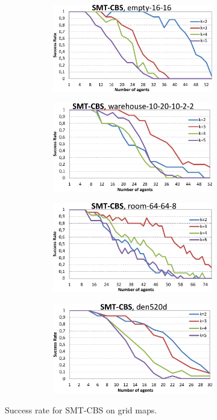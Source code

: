 \documentclass[review]{elsarticle}
\newcommand{\smtcbs}{SMT-CBS\xspace}
\begin{document}
\begin{figure}[t]
\centering
\begin{subfigure}
    \centering
    \begin{subfigure}
        \centering
        \includegraphics[width=0.45\linewidth]{mapfr-sr-plot-smtcbs-empty.pdf}
    \end{subfigure}\hspace{0.025\linewidth}
    \begin{subfigure}
        \centering
        \includegraphics[width=0.45\linewidth]{mapfr-sr-plot-smtcbs-warehouse.pdf}
    \end{subfigure}%
\end{subfigure}

\begin{subfigure}
    \centering

    \begin{subfigure}
        \centering
        \includegraphics[width=0.45\linewidth]{mapfr-sr-plot-smtcbs-room.pdf}
    \end{subfigure}\hspace{0.025\linewidth}
    \begin{subfigure}
        \centering
        \includegraphics[width=0.45\linewidth]{mapfr-sr-plot-smtcbs-den520d.pdf}
    \end{subfigure}%
\end{subfigure}

\caption{Success rate for \smtcbs on grid maps.}
\label{fig:results-success-rate-smt-grids}
\end{figure}
\end{document}
